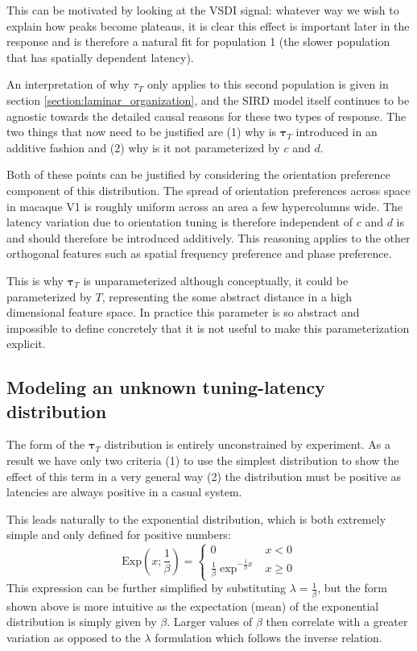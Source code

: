 \documentclass[phd,ianc,twoside]{infthesis}
\begin{document}
This can be motivated by looking at the VSDI signal: whatever way we
wish to explain how peaks become plateaus, it is clear this effect is
important later in the response and is therefore a natural fit for
population 1 (the slower population that has spatially dependent
latency).

An interpretation of why $\tau_T$ only applies to this second population
is given in section \ref{section:laminar_organization}, and the SIRD
model itself continues to be agnostic towards the detailed causal
reasons for these two types of response. The two things that now need to
be justified are (1) why is $\pmb{\tau}_T$ introduced in an additive
fashion and (2) why is it not parameterized by $c$ and $d$.

Both of these points can be justified by considering the orientation
preference component of this distribution. The spread of orientation
preferences across space in macaque V1 is roughly uniform across an area
a few hypercolumns wide. The latency variation due to orientation tuning
is therefore independent of $c$ and $d$ is and should therefore be
introduced additively. This reasoning applies to the other orthogonal
features such as spatial frequency preference and phase preference.

This is why $\pmb{\tau}_T$ is unparameterized although conceptually, it
could be parameterized by $T$, representing the some abstract distance
in a high dimensional feature space. In practice this parameter is so
abstract and impossible to define concretely that it is not useful to
make this parameterization explicit.

\subsection{Modeling an unknown tuning-latency distribution}

The form of the $\pmb{\tau}_T$ distribution is entirely unconstrained by
experiment. As a result we have only two criteria (1) to use the
simplest distribution to show the effect of this term in a very general
way (2) the distribution must be positive as latencies are always
positive in a casual system.

This leads naturally to the exponential distribution, which is both
extremely simple and only defined for positive numbers:
\begin{equation}
    \label{eq:SIRD_exponential}
\mathrm{Exp}(x;\frac{1}{\beta}) =
\begin{cases}
   0 & x < 0 \\ \frac{1}{\beta} \exp^{-\frac{1}{\beta} x} & x \geq 0
   \end{cases}
\end{equation}
This expression can be further simplified by substituting $\lambda =
\frac{1}{\beta}$, but the form shown above is more intuitive as the
expectation (mean) of the exponential distribution is simply given by
$\beta$. Larger values of $\beta$ then correlate with a greater
variation as opposed to the $\lambda$ formulation which follows the
inverse relation.
\end{document}
